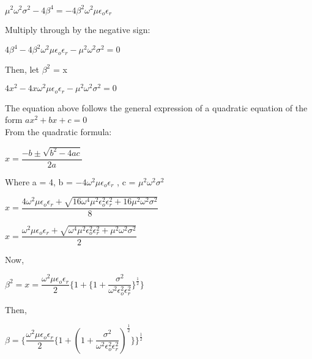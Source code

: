 \begin{center}
$\mu^{2}\omega^{2}\sigma^{2} - 4\beta^{4} = -4\beta^{2}\omega^{2}\mu\epsilon_{o}\epsilon_{r}$
\end{center}

Multiply through by the negative sign:

\begin{center}
$4\beta^{4} -4\beta^{2}\omega^{2}\mu\epsilon_{o}\epsilon_{r} - \mu^{2}\omega^{2}\sigma^{2} = 0$
\end{center}

Then, let $\beta^{2}$ = x
\begin{center}
$4x^{2} -4x\omega^{2}\mu\epsilon_{o}\epsilon_{r} - \mu^{2}\omega^{2}\sigma^{2} = 0$
\end{center}
The equation above follows the general expression of a quadratic equation of the form $ax^2 + bx + c = 0$
\\
From the quadratic formula:

\begin{center}
$x = \dfrac{-b\pm \sqrt{b^{2} - 4ac}}{2a}$
\end{center}

Where a = 4, b = $-4\omega^{2}\mu\epsilon_{o}\epsilon_{r}$ , c = $\mu^{2}\omega^{2}\sigma^{2}$

\begin{center}
$x = \dfrac{4\omega^{2}\mu\epsilon_{o}\epsilon_{r} + \sqrt{16\omega^{4}\mu^{2}\epsilon_{o}^{2}\epsilon_{r}^{2} + 16\mu^{2}\omega^{2}\sigma^{2}}}{8}$
\end{center}

\begin{center}
$x = \dfrac{\omega^{2}\mu\epsilon_{o}\epsilon_{r} + \sqrt{\omega^{4}\mu^{2}\epsilon_{o}^{2}\epsilon_{r}^{2} + \mu^{2}\omega^{2}\sigma^{2}}}{2}$
\end{center}

Now,
\begin{center}
$\beta^{2} = x = \dfrac{\omega^{2}\mu\epsilon_{o}\epsilon_{r}}{2}\Bigg\{1 + \bigg\{1 + \dfrac{\sigma^{2}}{\omega^{2}\epsilon_{o}^{2}\epsilon_{r}^{2}}\bigg\}^{\frac{1}{2}}\Bigg\}$
\end{center}

Then,

\begin{center}
$\beta =\Bigg\{ \dfrac{\omega^{2}\mu\epsilon_{o}\epsilon_{r}}{2}\bigg\{1 + (1 + \dfrac{\sigma^{2}}{\omega^{2}\epsilon_{o}^{2}\epsilon_{r}^{2}})^{\frac{1}{2}}\bigg\}\Bigg\}^{\frac{1}{2}}$
\end{center}

